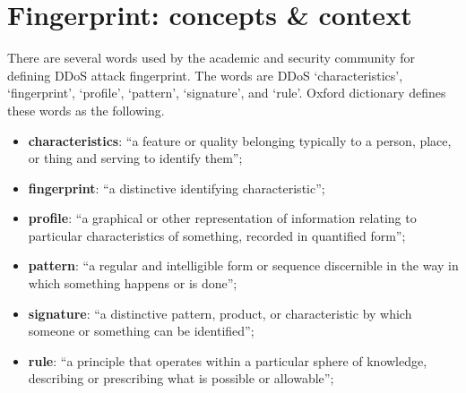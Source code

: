 \section{Fingerprint: concepts \& context}

There are several words used by the academic and security community for defining DDoS attack fingerprint. The words are DDoS `characteristics', `fingerprint', `profile', `pattern', `signature', and `rule'. Oxford dictionary defines these words as the following.

\begin{itemize}
	\item \textbf{characteristics}: ``a feature or quality belonging typically to a person, place, or thing and serving to identify them'';
	\item \textbf{fingerprint}: ``a distinctive identifying characteristic'';
	\item \textbf{profile}: ``a graphical or other representation of information relating to particular characteristics of something, recorded in quantified form'';
	\item \textbf{pattern}: ``a regular and intelligible form or sequence discernible in the way in which something happens or is done'';
	\item \textbf{signature}: ``a distinctive pattern, product, or characteristic by which someone or something can be identified'';
	\item \textbf{rule}: ``a principle that operates within a particular sphere of knowledge, describing or prescribing what is possible or allowable'';
\end{itemize}











 
